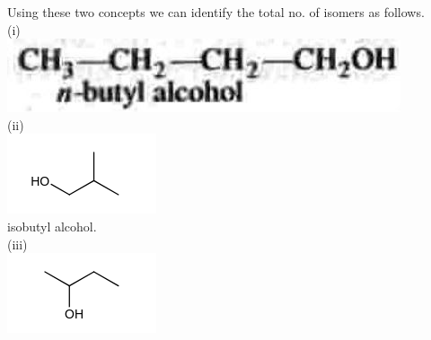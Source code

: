 \documentclass[10pt]{article}
\begin{document}
Using these two concepts we can identify the total no. of isomers as follows.\\
(i)\\
\includegraphics[max width=\textwidth, center]{2025_01_28_8470952b98110cec3aabg-163}\\
(ii)\\
\includegraphics{smile-aac20ce2595b408a4de35cfc4c2df75d4c90d503}\\
isobutyl alcohol.\\
(iii)\\
\includegraphics{smile-3db711c354069af40b2eab1730ddf8d03fc7314e}
\end{document}
